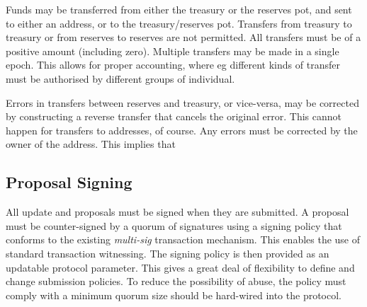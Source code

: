 Funds may be transferred from either the treasury or the reserves pot, and sent to either an address, or to the treasury/reserves pot.
Transfers from treasury to treasury or from reserves to reserves are not permitted.  All transfers must be of a positive amount (including zero).
Multiple transfers may be made in a single epoch.  This allows for proper accounting, where eg different kinds of transfer must
be authorised by different groups of individual.

Errors in transfers between reserves and treasury, or vice-versa, may be corrected by constructing a reverse transfer that cancels the original error.
This cannot happen for transfers to addresses, of course.  Any errors must be corrected by the owner of the address.  This implies that

\subsection{Proposal Signing}

All update and proposals must be signed when they are submitted.  A proposal must be counter-signed by a quorum of signatures using a signing
policy that conforms to the existing \emph{multi-sig} transaction mechanism.  This enables the use of standard transaction witnessing.
The signing policy is then provided as an updatable protocol parameter.  This gives a great deal of flexibility to define and change submission policies.
To reduce the possibility of abuse, the policy must comply with a minimum quorum size should be hard-wired into the protocol.


